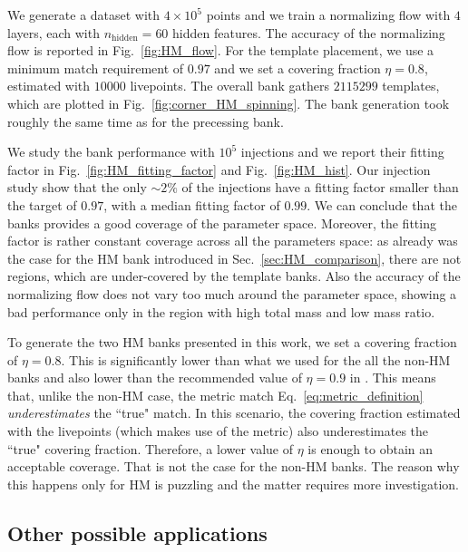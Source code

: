 \documentclass[twocolumn,showpacs,preprintnumbers,nofootinbib,prd,
superscriptaddress,10pt]{revtex4-2}
\begin{document}
We generate a dataset with $4\times 10^5$ points and we train a normalizing flow with $4$ layers, each with $n_\text{hidden} = 60$ hidden features. The accuracy of the normalizing flow is reported in Fig.~\ref{fig:HM_flow}.
For the template placement, we use a minimum match requirement of $0.97$ and we set a covering fraction $\eta = 0.8$, estimated with $10000$ livepoints.
The overall bank gathers $2115299$ templates, which are plotted in Fig.~\ref{fig:corner_HM_spinning}.
The bank generation took roughly the same time as for the precessing bank.

We study the bank performance with $10^5$ injections and we report their fitting factor in Fig.~\ref{fig:HM_fitting_factor} and Fig.~\ref{fig:HM_hist}.
Our injection study show that the only $\sim 2\%$ of the injections have a fitting factor smaller than the target of $0.97$, with a median fitting factor of $0.99$. We can conclude that the banks provides a good coverage of the parameter space.
Moreover, the fitting factor is rather constant coverage across all the parameters space: as already was the case for the HM bank introduced in Sec.~\ref{sec:HM_comparison}, there are not regions, which are under-covered by the template banks.
Also the accuracy of the normalizing flow does not vary too much around the parameter space, showing a bad performance only in the region with high total mass and low mass ratio.

To generate the two HM banks presented in this work, we set a covering fraction of $\eta = 0.8$. This is significantly lower than what we used for the all the non-HM banks and also lower than the recommended value of $\eta = 0.9$ in \cite{Coogan:2022qxs}.
This means that, unlike the non-HM case, the metric match Eq.~\ref{eq:metric_definition} {\it underestimates} the ``true" match. In this scenario, the covering fraction estimated with the livepoints (which makes use of the metric) also underestimates the ``true" covering fraction. Therefore, a lower value of $\eta$ is enough to obtain an acceptable coverage. That is not the case for the non-HM banks.
The reason why this happens only for HM is puzzling and the matter requires more investigation.

\subsection{Other possible applications} \label{sec:other_applications}
\end{document}
